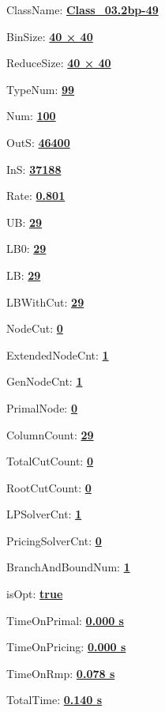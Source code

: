 \documentclass[11pt]{article}
\begin{document}
\pagestyle{empty}


ClassName: \underline{\textbf{Class_03.2bp-49}}
\par
BinSize: \underline{\textbf{40 × 40}}
\par
ReduceSize: \underline{\textbf{40 × 40}}
\par
TypeNum: \underline{\textbf{99}}
\par
Num: \underline{\textbf{100}}
\par
OutS: \underline{\textbf{46400}}
\par
InS: \underline{\textbf{37188}}
\par
Rate: \underline{\textbf{0.801}}
\par
UB: \underline{\textbf{29}}
\par
LB0: \underline{\textbf{29}}
\par
LB: \underline{\textbf{29}}
\par
LBWithCut: \underline{\textbf{29}}
\par
NodeCut: \underline{\textbf{0}}
\par
ExtendedNodeCnt: \underline{\textbf{1}}
\par
GenNodeCnt: \underline{\textbf{1}}
\par
PrimalNode: \underline{\textbf{0}}
\par
ColumnCount: \underline{\textbf{29}}
\par
TotalCutCount: \underline{\textbf{0}}
\par
RootCutCount: \underline{\textbf{0}}
\par
LPSolverCnt: \underline{\textbf{1}}
\par
PricingSolverCnt: \underline{\textbf{0}}
\par
BranchAndBoundNum: \underline{\textbf{1}}
\par
isOpt: \underline{\textbf{true}}
\par
TimeOnPrimal: \underline{\textbf{0.000 s}}
\par
TimeOnPricing: \underline{\textbf{0.000 s}}
\par
TimeOnRmp: \underline{\textbf{0.078 s}}
\par
TotalTime: \underline{\textbf{0.140 s}}
\par
\newpage


\end{document}
